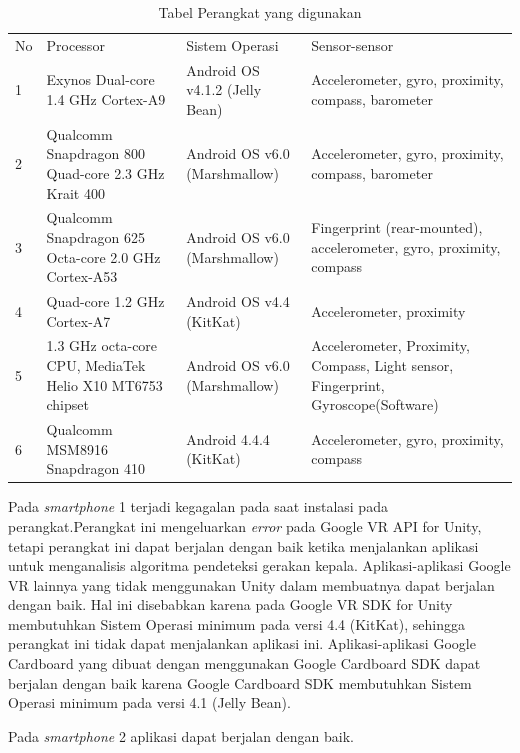 \begin{table}[]
    \centering
    \begin{tabular}{|p{1cm}||p{4cm}|p{4cm}|p{4cm}|}
    \hline\\
    \hline
       No  & Processor & Sistem Operasi & Sensor-sensor \\
    \hline
        1 &  Exynos Dual-core 1.4 GHz Cortex-A9 & Android OS v4.1.2 (Jelly Bean) & Accelerometer, gyro, proximity, compass, barometer\\
    \hline
        2 &  Qualcomm Snapdragon 800 Quad-core 2.3 GHz Krait 400 & Android OS v6.0 (Marshmallow) & Accelerometer, gyro, proximity, compass, barometer\\
    \hline
        3 &  Qualcomm Snapdragon 625 Octa-core 2.0 GHz Cortex-A53 & Android OS v6.0 (Marshmallow) & Fingerprint (rear-mounted), accelerometer, gyro, proximity, compass\\
    \hline
        4 &  Quad-core 1.2 GHz Cortex-A7 &  Android OS v4.4 (KitKat) & Accelerometer, proximity\\
    \hline
        5 &  1.3 GHz octa-core CPU, MediaTek Helio X10 MT6753 chipset & Android OS v6.0 (Marshmallow) & Accelerometer, Proximity, Compass, Light sensor, Fingerprint, Gyroscope(Software)\\
    \hline
        6 & Qualcomm MSM8916 Snapdragon 410 & Android 4.4.4 (KitKat) & Accelerometer, gyro, proximity, compass\\
    \hline
    \end{tabular}
    \caption{Tabel Perangkat yang digunakan}
    \label{tab:tabel_perangkat_yang_digunakan}
\end{table}

Pada \textit{smartphone} 1 terjadi kegagalan pada saat instalasi pada perangkat.Perangkat ini mengeluarkan \textit{error} pada Google VR API for Unity, tetapi perangkat ini dapat berjalan dengan baik ketika menjalankan aplikasi untuk menganalisis algoritma pendeteksi gerakan kepala. Aplikasi-aplikasi Google VR lainnya yang tidak menggunakan Unity dalam membuatnya dapat berjalan dengan baik. Hal ini disebabkan karena pada Google VR SDK for Unity membutuhkan Sistem Operasi minimum pada versi 4.4 (KitKat), sehingga perangkat ini tidak dapat menjalankan aplikasi ini. Aplikasi-aplikasi Google Cardboard yang dibuat dengan menggunakan Google Cardboard SDK dapat berjalan dengan baik karena Google Cardboard SDK membutuhkan Sistem Operasi minimum pada versi 4.1 (Jelly Bean).

Pada \textit{smartphone} 2 aplikasi dapat berjalan dengan baik. 

